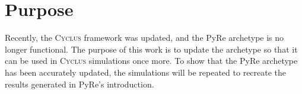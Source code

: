 \documentclass{anstrans}
\newcommand{\cyclus}{\textsc{Cyclus}\xspace}
\begin{document}
\section{Purpose}

Recently, the \cyclus framework was updated, and the PyRe archetype is no longer functional. The purpose of this work is to update the archetype so that it can be used in \cyclus simulations once more. To show that the PyRe archetype has been accurately updated, the simulations will be repeated to recreate the results generated in PyRe’s introduction.




\end{document}
